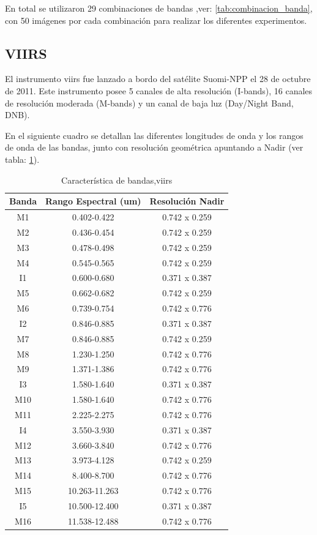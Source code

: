 En total se utilizaron 29 combinaciones de bandas ,ver: \ref{tab:combinacion_banda}, con 50 imágenes por cada combinación para realizar los diferentes experimentos.



\subsection{VIIRS}\label{sub:viirs}
El instrumento \ac{viirs} fue lanzado a bordo del satélite Suomi-NPP el 28 de octubre de 2011. Este instrumento posee 5 canales de alta resolución (I-bands), 16 canales de resolución moderada (M-bands) y un canal de baja luz (Day/Night Band, DNB). 

En el siguiente cuadro se detallan las diferentes longitudes de onda y los rangos de onda de las bandas, junto con resolución geométrica apuntando a Nadir (ver tabla: \ref{tab:viirs}).
\begin{table}[H]
\begin{center}
\begin{tabular}{|c|c|c|}
\hline Banda & Rango Espectral (um) & Resolución Nadir \\\hline 
 		M1  & 0.402-0.422   & 0.742 x 0.259 \\ \hline 
		M2  & 0.436-0.454   & 0.742 x 0.259 \\ \hline 
		M3  & 0.478-0.498   & 0.742 x 0.259 \\ \hline 
		M4  & 0.545-0.565   & 0.742 x 0.259 \\ \hline 
		I1  & 0.600-0.680   & 0.371 x 0.387 \\ \hline 
		M5  & 0.662-0.682   & 0.742 x 0.259 \\ \hline 
		M6  & 0.739-0.754   & 0.742 x 0.776 \\ \hline 
		I2  & 0.846-0.885   & 0.371 x 0.387 \\ \hline 
		M7  & 0.846-0.885   & 0.742 x 0.259 \\ \hline 
		M8  & 1.230-1.250   & 0.742 x 0.776 \\ \hline 
		M9  & 1.371-1.386   & 0.742 x 0.776 \\ \hline 
		I3  & 1.580-1.640   & 0.371 x 0.387 \\ \hline 
		M10 & 1.580-1.640   & 0.742 x 0.776 \\ \hline 
		M11 & 2.225-2.275   & 0.742 x 0.776 \\ \hline 
		I4  & 3.550-3.930   & 0.371 x 0.387 \\ \hline 
		M12 & 3.660-3.840   & 0.742 x 0.776 \\ \hline 
		M13 & 3.973-4.128   & 0.742 x 0.259 \\ \hline 
		M14 & 8.400-8.700   & 0.742 x 0.776 \\ \hline 
		M15 & 10.263-11.263 & 0.742 x 0.776 \\ \hline 
		I5  & 10.500-12.400 & 0.371 x 0.387 \\ \hline 
		M16 & 11.538-12.488 & 0.742 x 0.776 \\ \hline 
\end{tabular}
\end{center}\caption{Característica de bandas,\ac{viirs} \label{tab:viirs}}
\end{table}


